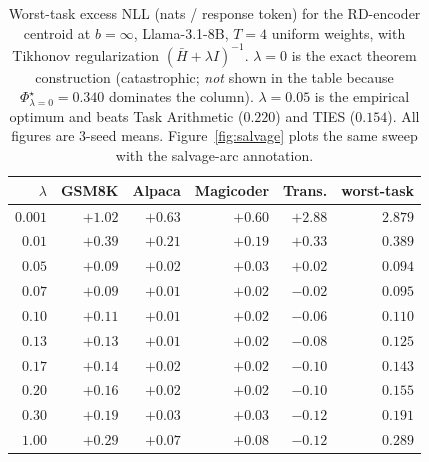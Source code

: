 \begin{table}[t]
\centering
\caption{Worst-task excess NLL (nats / response token) for the
RD-encoder centroid at $b = \infty$, Llama-3.1-8B, $T = 4$ uniform
weights, with Tikhonov regularization
$(\bar H + \lambda I)^{-1}$. $\lambda = 0$ is the exact theorem
construction (catastrophic; \emph{not} shown in the table because
$\Phi^\star_{\lambda=0} = 0.340$ dominates the column). $\lambda =
0.05$ is the empirical optimum and beats Task Arithmetic ($0.220$)
and TIES ($0.154$). All figures are $3$-seed means.
Figure~\ref{fig:salvage} plots the same sweep
with the salvage-arc annotation.}
\label{tab:rd-ridge-sweep}
\begin{tabular}{rrrrrr}
\hline
$\lambda$ & GSM8K & Alpaca & Magicoder & Trans. & worst-task \\
\hline
$0.001$ & $+1.02$ & $+0.63$ & $+0.60$ & $+2.88$ & $\mathbf{2.879}$ \\
$0.01$  & $+0.39$ & $+0.21$ & $+0.19$ & $+0.33$ & $0.389$ \\
$0.05$  & $+0.09$ & $+0.02$ & $+0.03$ & $+0.02$ & $\mathbf{0.094}$ \\
$0.07$  & $+0.09$ & $+0.01$ & $+0.02$ & $-0.02$ & $0.095$ \\
$0.10$  & $+0.11$ & $+0.01$ & $+0.02$ & $-0.06$ & $0.110$ \\
$0.13$  & $+0.13$ & $+0.01$ & $+0.02$ & $-0.08$ & $0.125$ \\
$0.17$  & $+0.14$ & $+0.02$ & $+0.02$ & $-0.10$ & $0.143$ \\
$0.20$  & $+0.16$ & $+0.02$ & $+0.02$ & $-0.10$ & $0.155$ \\
$0.30$  & $+0.19$ & $+0.03$ & $+0.03$ & $-0.12$ & $0.191$ \\
$1.00$  & $+0.29$ & $+0.07$ & $+0.08$ & $-0.12$ & $0.289$ \\
\hline
\end{tabular}
\end{table}

